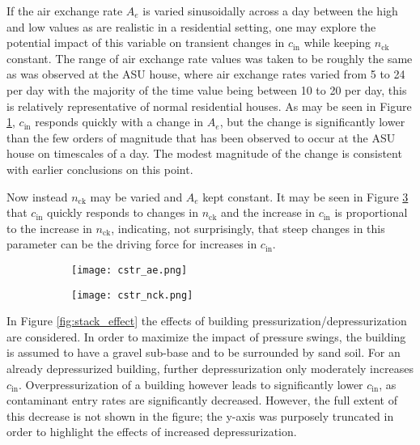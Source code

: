 \documentclass[journal=esthag,manuscript=suppinfo]{achemso}
\begin{document}
If the air exchange rate $A_e$ is varied sinusoidally across a day between the high and low values as are realistic in a residential setting, one may explore the potential impact of this variable on transient changes in $c_\mathrm{in}$ while keeping $n_\mathrm{ck}$ constant.
The range of air exchange rate values was taken to be roughly the same as was observed at the ASU house, where air exchange rates varied from 5 to 24 per day with the majority of the time value being between 10 to 20 per day\cite{Holton2013a,Holton2015a}, this is relatively representative of normal residential houses\cite{Murray1995a}.
As may be seen in Figure \ref{fig:cstr_ae}, $c_\mathrm{in}$ responds quickly with a change in $A_e$, but the change is significantly lower than the few orders of magnitude that has been observed to occur at the ASU house on timescales of a day.
The modest magnitude of the change is consistent with earlier conclusions on this point\cite{Shen2016a}. \par

Now instead $n_\mathrm{ck}$ may be varied and $A_e$ kept constant.
It may be seen in Figure \ref{fig:cstr_nck} that $c_\mathrm{in}$ quickly responds to changes in $n_\mathrm{ck}$ and the increase in $c_\mathrm{in}$ is proportional to the increase in $n_\mathrm{ck}$, indicating, not surprisingly, that steep changes in this parameter can be the driving force for increases in $c_\mathrm{in}$. \par

\begin{figure}[!htb]
  \caption[Varying air exchange and contaminant entry rate impact on indoor air concentration]{Varying inputs of the indoor air contaminant concentration calculation. () considers the impact of varying air exchange rate with constant contaminant entry rate. () considers the impact of varying contaminant entry rate with constant air exchange rate.}
  \begin{subfigure}[b]{0.9\textwidth}
    \caption{ } \label{fig:cstr_ae}
    \texttt{[image: cstr\_ae.png]}
  \end{subfigure}
  \begin{subfigure}[b]{0.9\textwidth}
    \caption{ } \label{fig:cstr_nck}
    \texttt{[image: cstr\_nck.png]}
  \end{subfigure}
\end{figure}

In Figure \ref{fig:stack_effect} the effects of building pressurization/depressurization are considered.
In order to maximize the impact of pressure swings, the building is assumed to have a gravel sub-base and to be surrounded by sand soil.
For an already depressurized building, further depressurization only moderately increases $c_\mathrm{in}$.
Overpressurization of a building however leads to significantly lower $c_\mathrm{in}$, as contaminant entry rates are significantly decreased.
However, the full extent of this decrease is not shown in the figure; the y-axis was purposely truncated in order to highlight the effects of increased depressurization. \par
\end{document}
